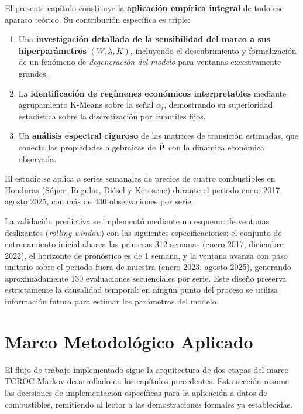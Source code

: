 El presente capítulo constituye la \textbf{aplicación empírica
integral} de todo ese aparato teórico.  Su contribución específica es
triple:
\begin{enumerate}
    \item Una \textbf{investigación detallada de la sensibilidad del
    marco a sus hiperparámetros} $(W, \lambda, K)$, incluyendo el
    descubrimiento y formalización de un fenómeno de
    \emph{degeneración del modelo} para ventanas excesivamente
    grandes.
    \item La \textbf{identificación de regímenes económicos
    interpretables} mediante agrupamiento K-Means
    \cite{MacQueen1967} sobre la señal $\alpha_t$, demostrando su
    superioridad estadística sobre la discretización por cuantiles
    fijos.
    \item Un \textbf{análisis espectral riguroso} de las matrices de
    transición estimadas, que conecta las propiedades algebraicas de
    $\hat{\mathbf{P}}$ con la dinámica económica observada.
\end{enumerate}

El estudio se aplica a series semanales de precios de cuatro
combustibles en Honduras (Súper, Regular, Diésel y Kerosene) durante
el periodo enero 2017, agosto 2025, con más de 400 observaciones
por serie.

La validación predictiva se implementó mediante un esquema de ventanas 
deslizantes (\textit{rolling window}) con las siguientes especificaciones: 
el conjunto de entrenamiento inicial abarca las primeras 312 semanas 
(enero 2017, diciembre 2022), el horizonte de pronóstico es de 1 semana, 
y la ventana avanza con paso unitario sobre el periodo fuera de muestra 
(enero 2023, agosto 2025), generando aproximadamente 130 evaluaciones 
secuenciales por serie. Este diseño preserva estrictamente la causalidad temporal: 
en ningún punto del proceso se utiliza información futura para estimar los parámetros del modelo.

\section{Marco Metodológico Aplicado}
\label{sec:combustibles_metodologia}

El flujo de trabajo implementado sigue la arquitectura de dos etapas
del marco TCROC-Markov desarrollado en los capítulos precedentes.
Esta sección resume las decisiones de implementación específicas para
la aplicación a datos de combustibles, remitiendo al lector a las
demostraciones formales ya establecidas.

